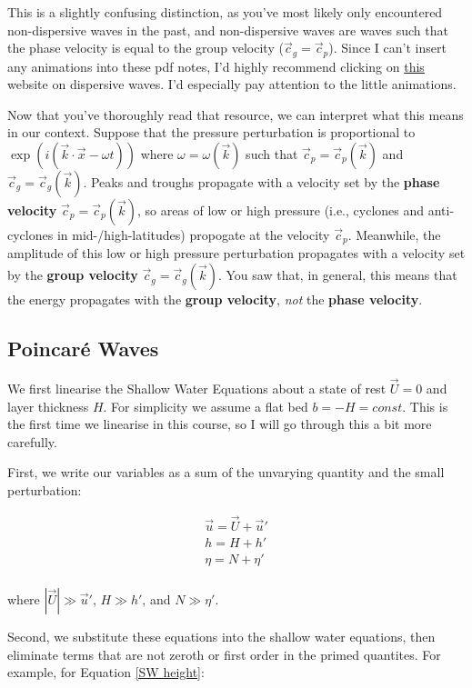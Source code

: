 This is a slightly confusing distinction, as you've most likely only encountered non-dispersive waves in the past, and non-dispersive waves are waves such that the phase velocity is equal to the group velocity ($\vec{c}_g=\vec{c}_p$). Since I can't insert any animations into these pdf notes, I'd highly recommend clicking on \href{https://resource.isvr.soton.ac.uk/spcg/tutorial/tutorial/Tutorial_files/Web-further-dispersive.htm}{this} website on dispersive waves. I'd especially pay attention to the little animations.

Now that you've thoroughly read that resource, we can interpret what this means in our context. Suppose that the pressure perturbation is proportional to $\exp(i(\vec{k}\cdot\vec{x}-\omega t))$ where $\omega=\omega(\vec{k})$ such that $\vec{c}_p=\vec{c}_p(\vec{k})$ and $\vec{c}_g=\vec{c}_g(\vec{k})$. Peaks and troughs propagate with a velocity set by the \textbf{phase velocity} $\vec{c}_p=\vec{c}_p(\vec{k})$, so areas of low or high pressure (i.e., cyclones and anti-cyclones in mid-/high-latitudes) propogate at the velocity $\vec{c}_p$. Meanwhile, the amplitude of this low or high pressure perturbation propagates with a velocity set by the \textbf{group velocity} $\vec{c}_g=\vec{c}_g(\vec{k})$. You saw that, in general, this means that the energy propagates with the \textbf{group velocity}, \textit{not} the \textbf{phase velocity}.

\subsection{Poincaré Waves}

We first linearise the Shallow Water Equations about a state of rest $\vec{U}=0$ and layer thickness $H$. For simplicity we assume a flat bed $b=-H=const$. This is the first time we linearise in this course, so I will go through this a bit more carefully.

First, we write our variables as a sum of the unvarying quantity and the small perturbation:

\begin{align*}
    \vec{u}=\vec{U}+\vec{u}'\\
    h = H + h'\\
    \eta = N + \eta'\\
\end{align*}

\noindent where $|\vec{U}|\gg \vec{u}'$, $H\gg h'$, and $N\gg \eta'$. 

Second, we substitute these equations into the shallow water equations, then eliminate terms that are not zeroth or first order in the primed quantites. For example, for Equation \ref{SW height}:

